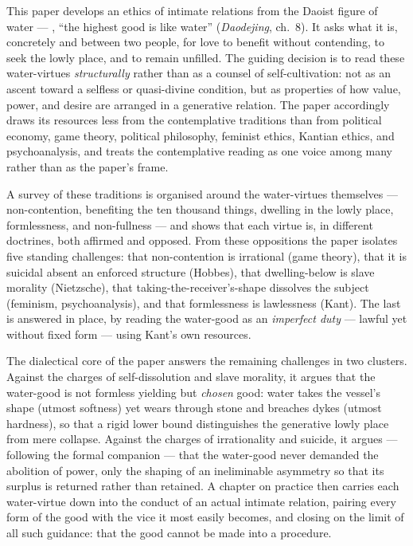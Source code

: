 This paper develops an ethics of intimate relations from the Daoist figure of water --- , ``the highest good is like water'' (\emph{Daodejing}, ch.~8). It asks what it is, concretely and between two people, for love to benefit without contending, to seek the lowly place, and to remain unfilled. The guiding decision is to read these water-virtues \emph{structurally} rather than as a counsel of self-cultivation: not as an ascent toward a selfless or quasi-divine condition, but as properties of how value, power, and desire are arranged in a generative relation. The paper accordingly draws its resources less from the contemplative traditions than from political economy, game theory, political philosophy, feminist ethics, Kantian ethics, and psychoanalysis, and treats the contemplative reading as one voice among many rather than as the paper's frame.

A survey of these traditions is organised around the water-virtues themselves --- non-contention, benefiting the ten thousand things, dwelling in the lowly place, formlessness, and non-fullness --- and shows that each virtue is, in different doctrines, both affirmed and opposed. From these oppositions the paper isolates five standing challenges: that non-contention is irrational (game theory), that it is suicidal absent an enforced structure (Hobbes), that dwelling-below is slave morality (Nietzsche), that taking-the-receiver's-shape dissolves the subject (feminism, psychoanalysis), and that formlessness is lawlessness (Kant). The last is answered in place, by reading the water-good as an \emph{imperfect duty} --- lawful yet without fixed form --- using Kant's own resources.

The dialectical core of the paper answers the remaining challenges in two clusters. Against the charges of self-dissolution and slave morality, it argues that the water-good is not formless yielding but \emph{chosen} good: water takes the vessel's shape (utmost softness) yet wears through stone and breaches dykes (utmost hardness), so that a rigid lower bound distinguishes the generative lowly place from mere collapse. Against the charges of irrationality and suicide, it argues --- following the formal companion \textcite{wan2026braid} --- that the water-good never demanded the abolition of power, only the shaping of an ineliminable asymmetry so that its surplus is returned rather than retained. A chapter on practice then carries each water-virtue down into the conduct of an actual intimate relation, pairing every form of the good with the vice it most easily becomes, and closing on the limit of all such guidance: that the good cannot be made into a procedure.

